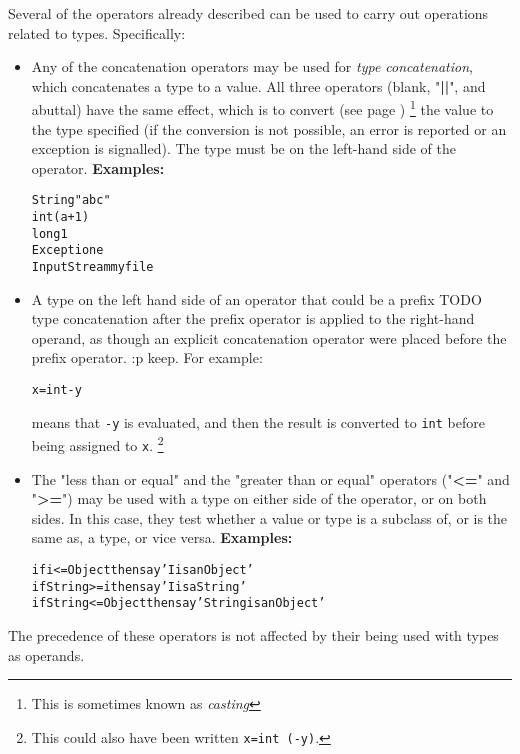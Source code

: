 \begin{description}
Several of the operators already described can be used to carry out
operations related to types.  Specifically:
\begin{itemize}
\item Any of the concatenation operators may be used for \emph{type
concatenation}, which concatenates a type to a value.  All three
operators (blank, "\textbf{||}", and abuttal) have the same
effect, which is to  convert (see page \pageref{refconv}) 
\footnote{
This is sometimes known as \emph{casting}
}
the value to the type
specified (if the conversion is not possible, an error is reported or an
exception is signalled).
The type must be on the left-hand side of the operator.
 \textbf{Examples:}
\begin{alltt}
String "abc"
int (a+1)
long 1
Exception e
InputStream myfile
\end{alltt}
\item 
{}
A type on the left hand side of an operator that could be a prefix
TODO
type concatenation after the prefix operator is applied to the
right-hand operand, as though an explicit concatenation operator were
placed before the prefix operator.
:p keep.
For example:
\begin{alltt}
x=int -y
\end{alltt}
means that \texttt{-y} is evaluated, and then the result is
converted to \texttt{int} before being assigned to \texttt{x}.
\footnote{
This could also have been written \texttt{x=int (-y)}.
}
\item 
\index{,}
\index{,}
The "less than or equal" and the "greater than or equal"
operators ("\textbf{<=}" and "\textbf{>=}") may be used
with a type on either side of the operator, or on both sides.
In this case, they test whether a value or type is a subclass of, or is
the same as, a type, or vice versa.
 \textbf{Examples:}
\begin{alltt}
if i<=Object then say 'I is an Object'
if String>=i then say 'I is a String'
if String<=Object then say 'String is an Object'
\end{alltt}
\end{itemize}
The precedence of these operators is not affected by their being
used with types as operands.
\end{description}
